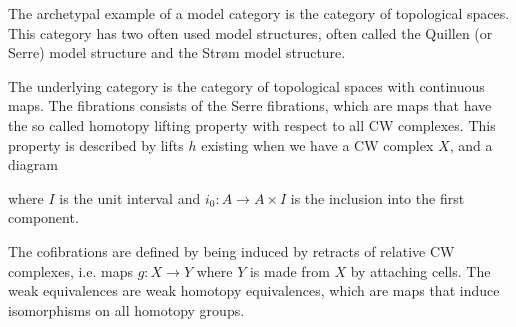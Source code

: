 The archetypal example of a model category is the category of topological spaces. This category has two often used model structures, often called the Quillen (or Serre) model structure and the Strøm model structure. 

\begin{example}
The underlying category is the category of topological spaces with continuous maps. The fibrations consists of the Serre fibrations, which are maps that have the so called homotopy lifting property with respect to all CW complexes. This property is described by lifts $h$ existing when we have a CW complex $X$, and a diagram
\begin{center}
\end{center}
where $I$ is the unit interval and $i_0:A\longrightarrow A\times I$ is the inclusion into the first component. 

The cofibrations are defined by being induced by retracts of relative CW complexes, i.e. maps $g:X\longrightarrow Y$ where $Y$ is made from $X$ by attaching cells. The weak equivalences are weak homotopy equivalences, which are maps that induce isomorphisms on all homotopy groups. 
\end{example}

